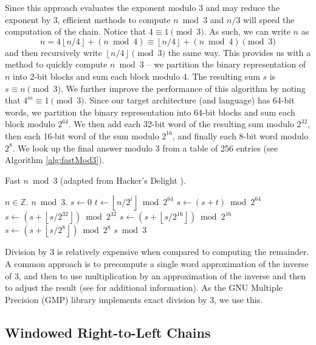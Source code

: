 \documentclass{ucalgthes1}
\theoremstyle{definition}
\newcommand{\ZZ}{\mathbb{Z}}
\newcommand{\floor}[1]{\left\lfloor #1 \right\rfloor}
\begin{document}
Since this approach evaluates the exponent modulo 3 and may reduce the exponent by 3, efficient methods to compute $n \bmod 3$ and $n/3$ will speed the computation of the chain. Notice that $4 \equiv 1 \pmod 3$.  As such, we can write $n$ as
\[
n = 4 \floor{n/4} + (n \bmod 4) \equiv \floor{n/4} + (n \bmod 4) \pmod 3
\]
and then recursively write $\floor{n/4} \pmod 3$ the same way. This provides us with a method to quickly compute $n \bmod 3$ -- we partition the binary representation of $n$ into \mbox{2-bit} blocks and sum each block modulo 4.  The resulting sum $s$ is $s \equiv n \pmod 3$.  We further improve the performance of this algorithm by noting that $4^m \equiv 1 \pmod 3$.  Since our target architecture (and language) has 64-bit words, we partition the binary representation into 64-bit blocks and sum each block modulo $2^{64}$.  We then add each 32-bit word of the resulting sum modulo $2^{32}$, then each 16-bit word of the sum modulo $2^{16}$, and finally each 8-bit word modulo $2^8$.  We look up the final answer modulo 3 from a table of 256 entries (see Algorithm \ref{alg:fastMod3}).

\begin{algorithm}[h]
\caption{Fast $n \bmod 3$ (adapted from Hacker's Delight \cite{Warren2002}).}
\label{alg:fastMod3}
\begin{algorithmic}[1]
\REQUIRE $n \in \ZZ$.
\ENSURE $n \bmod 3$.
\STATE $s \gets 0$
\FOR {$i$ from $0$ to $\floor{\log_2 n}$ by 64}
	\STATE $t \gets \floor{n / 2^i} \bmod {2^{64}}$
	\STATE $s \gets (s + t) \bmod {2^{64}}$
\ENDFOR
\STATE $s \gets \left(s + \floor{s/{2^{32}}} \right) \bmod {2^{32}}$
\STATE $s \gets \left(s + \floor{s/{2^{16}}} \right) \bmod {2^{16}}$
\STATE $s \gets \left(s + \floor{s/{2^{8}}} \right) \bmod {2^{8}}$
\RETURN $s \bmod 3$ 
\end{algorithmic}
\end{algorithm}

Division by 3 is relatively expensive when compared to computing the remainder.  A common approach is to precompute a single word approximation of the inverse of 3, and then to use multiplication by an approximation of the inverse and then to adjust the result (see \cite{Granlund1994,Warren2002,Moller2011} for additional information).  As the GNU Multiple Precision (GMP) library implements exact division by 3, we use this.


\subsection{Windowed Right-to-Left Chains}
\end{document}
